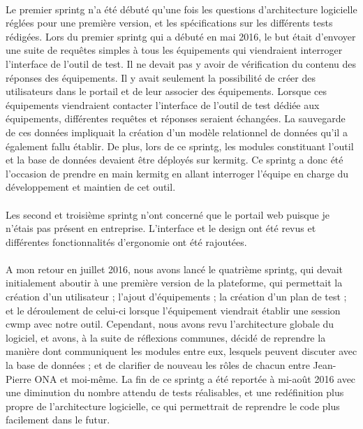\documentclass[12pt,a4paper]{report}
\begin{document}
\paragraph*{}Le premier \gls{sprintg} n’a été débuté qu’une fois les questions d’architecture logicielle réglées pour une première version, et les spécifications sur les différents tests rédigées. Lors du premier \gls{sprintg} qui a débuté en mai 2016, le but était d’envoyer une suite de requêtes simples à tous les équipements qui viendraient interroger l’interface de l’outil de test. Il ne devait pas y avoir de vérification du contenu des réponses des équipements. Il y avait seulement la possibilité de créer des utilisateurs dans le portail et de leur associer des équipements. Lorsque ces équipements viendraient contacter l’interface de l’outil de test dédiée aux équipements, différentes requêtes et réponses seraient échangées. La sauvegarde de ces données impliquait la création d’un modèle relationnel de données qu’il a également fallu établir. De plus, lors de ce \gls{sprintg}, les modules constituant l’outil et la base de données devaient être déployés sur \gls{kermitg}. Ce \gls{sprintg} a donc été l’occasion de prendre en main \gls{kermitg} en allant interroger l’équipe en charge du développement et maintien de cet outil.
\paragraph*{}Les second et troisième \gls{sprintg} n’ont concerné que le portail web
puisque je n’étais pas présent en entreprise. L’interface et le design ont été revus et différentes fonctionnalités d’ergonomie ont été rajoutées.
\paragraph*{} A mon retour en juillet 2016, nous avons lancé le quatrième \gls{sprintg}, qui devait initialement aboutir à une première version de la plateforme, qui permettait la création d’un utilisateur ; l’ajout d’équipements ; la création d’un plan de test ; et le déroulement de celui-ci lorsque l’équipement viendrait établir une session \gls{cwmp} avec notre outil. Cependant, nous avons revu l’architecture globale du logiciel, et avons, à la suite de réflexions communes, décidé de reprendre la manière dont communiquent les modules entre eux, lesquels peuvent discuter avec la base de données ; et de clarifier de nouveau les rôles de chacun entre Jean-Pierre ONA et moi-même. La fin de ce \gls{sprintg} a été reportée à mi-août 2016 avec une diminution du nombre attendu de tests réalisables, et une redéfinition plus propre de l’architecture logicielle, ce qui permettrait de reprendre le code plus facilement dans le futur.
\end{document}
